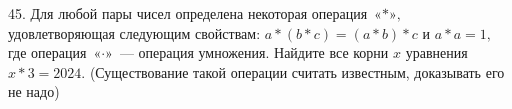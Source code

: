 45. Для любой пары чисел определена некоторая операция $\text{«$\ast$»,}$ удовлетворяющая следующим свойствам:
$a*(b*c)=(a*b)*c$ и $a*a=1,$ где операция $\text{«$\cdot$»}$ --- операция умножения. Найдите все корни $x$ уравнения
$x*3=2024.$ (Существование такой операции считать известным, доказывать его не надо)
\newpage
